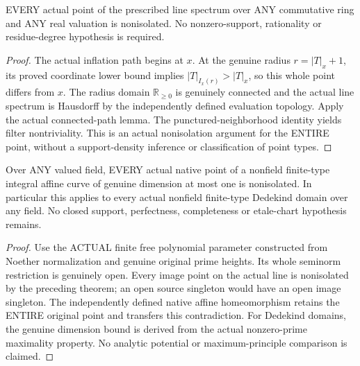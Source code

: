 \begin{theorem}
\label{spectrum:actual-all-line-points-nonisolation}
\leanok
{}
EVERY actual point of the prescribed line spectrum over ANY
commutative ring and ANY real valuation is nonisolated. No
nonzero-support, rationality or residue-degree hypothesis is required.
\end{theorem}
\begin{proof}
The actual inflation path begins at $x$. At the genuine radius
$r=|T|_x+1$, its proved coordinate lower bound implies
$|T|_{I_x(r)}> |T|_x$, so this whole point differs from $x$.
The radius domain $\mathbb R_{\ge0}$ is genuinely connected and
the actual line spectrum is Hausdorff by the independently defined
evaluation topology. Apply the actual connected-path lemma.
The punctured-neighborhood identity yields filter nontriviality.
This is an actual nonisolation argument for the ENTIRE point,
without a support-density inference or classification of point types.
\end{proof}

\begin{theorem}
\label{scheme:actual-all-integral-affine-curve-points-nonisolation}
\leanok
{}
Over ANY valued field, EVERY actual native point of a nonfield
finite-type integral affine curve of genuine dimension at most
one is nonisolated. In particular this applies to every actual
nonfield finite-type Dedekind domain over any field. No closed
support, perfectness, completeness or etale-chart hypothesis remains.
\end{theorem}
\begin{proof}
Use the ACTUAL finite free polynomial parameter constructed from
Noether normalization and genuine original prime heights. Its
whole seminorm restriction is genuinely open. Every image point
on the actual line is nonisolated by the preceding theorem; an
open source singleton would have an open image singleton.
The independently defined native affine homeomorphism retains
the ENTIRE original point and transfers this contradiction.
For Dedekind domains, the genuine dimension bound is derived
from the actual nonzero-prime maximality property. No analytic
potential or maximum-principle comparison is claimed.
\end{proof}
